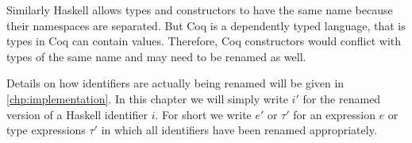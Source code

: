 Similarly Haskell allows types and constructors to have the same name because their namespaces are separated.
But Coq is a dependently typed language, that is types in Coq can contain values.
Therefore, Coq constructors would conflict with types of the same name and may need to be renamed as well.

Details on how identifiers are actually being renamed will be given in \autoref{chp:implementation}.
In this chapter we will simply write $i'$ for the renamed version of a Haskell identifier $i$.
For short we write $e'$ or $\tau'$ for an expression $e$ or type expressions $\tau'$ in which all identifiers have been renamed appropriately.
